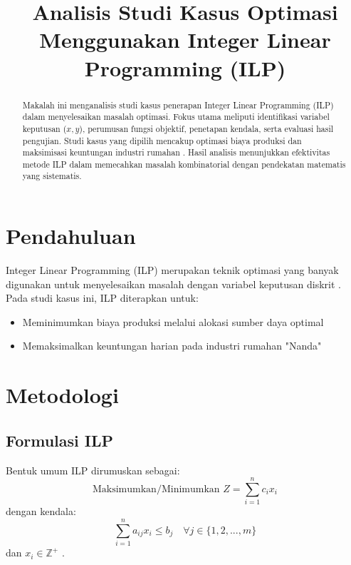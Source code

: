 \documentclass[conference]{IEEEtran}
\begin{document}
\title{Analisis Studi Kasus Optimasi Menggunakan Integer Linear Programming (ILP)}
\author{
}

\maketitle

\begin{abstract}
Makalah ini menganalisis studi kasus penerapan Integer Linear Programming (ILP) dalam menyelesaikan masalah optimasi. Fokus utama meliputi identifikasi variabel keputusan (\(x, y\)), perumusan fungsi objektif, penetapan kendala, serta evaluasi hasil pengujian. Studi kasus yang dipilih mencakup optimasi biaya produksi \cite{1} dan maksimisasi keuntungan industri rumahan \cite{10}. Hasil analisis menunjukkan efektivitas metode ILP dalam memecahkan masalah kombinatorial dengan pendekatan matematis yang sistematis.
\end{abstract}

\section{Pendahuluan}
Integer Linear Programming (ILP) merupakan teknik optimasi yang banyak digunakan untuk menyelesaikan masalah dengan variabel keputusan diskrit \cite{4}. Pada studi kasus ini, ILP diterapkan untuk:
\begin{itemize}
    \item Meminimumkan biaya produksi melalui alokasi sumber daya optimal \cite{1}
    \item Memaksimalkan keuntungan harian pada industri rumahan "Nanda" \cite{10}
\end{itemize}

\section{Metodologi}
\subsection{Formulasi ILP}
Bentuk umum ILP dirumuskan sebagai:
\begin{equation}
\text{Maksimumkan/Minimumkan } Z = \sum_{i=1}^{n} c_i x_i
\end{equation}
dengan kendala:
\begin{equation}
\sum_{i=1}^{n} a_{ij} x_i \leq b_j \quad \forall j \in \{1,2,...,m\}
\end{equation}
dan \(x_i \in \mathbb{Z}^+\) \cite{7}.
\end{document}
